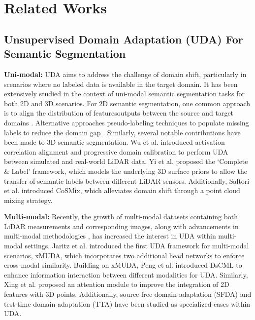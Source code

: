 \section{Related Works}

\subsection{Unsupervised Domain Adaptation (UDA) For Semantic Segmentation}

\textbf{Uni-modal:} UDA aims to address the challenge of domain shift, particularly in scenarios where no labeled data is available in the target domain. It has been extensively studied in the context of uni-modal semantic segmentation tasks for both 2D and 3D scenarios. For 2D semantic segmentation, one common approach is to align the distribution of featuresoutputs between the source and target domains \cite{tsai2018learning, hoffman2018cycada, hong2018conditional, vu2019advent}. Alternative approaches  pseudo-labeling techniques to populate missing labels to reduce the domain gap \cite{li2022class, mei2020instance, pan2020unsupervised, zhao2023learning}.
Similarly, several notable contributions have been made to 3D semantic segmentation. Wu et al. \cite{wu2019squeezesegv2} introduced activation correlation alignment and progressive domain calibration to perform UDA between simulated and real-world LiDAR data. Yi et al. \cite{yi2021complete} proposed the `Complete \& Label' framework, which models the underlying 3D surface priors to allow the transfer of semantic labels between different LiDAR sensors. Additionally, Saltori et al. \cite{saltori2022cosmix} introduced CoSMix, which alleviates domain shift through a point cloud mixing strategy.

\textbf{Multi-modal:} Recently, the growth of multi-modal datasets \cite{behley2019semantickitti, caesar2020nuscenes, geyer2020a2d2} containing both LiDAR measurements and corresponding images, along with advancements in multi-modal methodologies \cite{bai2022transfusion, meyer2019sensor, yang2022efficient}, has increased the interest in UDA within multi-modal settings. Jaritz et al. \cite{jaritz2020xmuda} introduced the first UDA framework for multi-modal scenarios, xMUDA, which incorporates two additional head networks to enforce cross-modal similarity. Building on xMUDA, Peng et al. \cite{peng2021sparse} introduced DsCML to enhance information interaction between different modalities for UDA. Similarly, Xing et al. \cite{xing2023cross} proposed an attention module to improve the integration of 2D features with 3D points. Additionally, source-free domain adaptation (SFDA) \cite{simons2023summit} and test-time domain adaptation (TTA) \cite{shin2022mm, cao2024reliable} have been studied as specialized cases within UDA.


